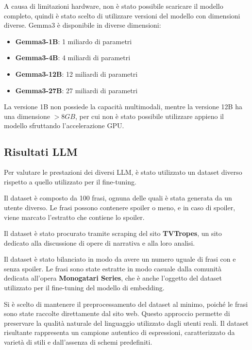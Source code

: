 A causa di limitazioni hardware, non è stato possibile
scaricare il modello completo, quindi è stato scelto di
utilizzare versioni del modello con dimensioni diverse.
Gemma3 è disponibile in diverse dimensioni:

\begin{itemize}
  \item \textbf{Gemma3-1B}: 1 miliardo di parametri
  \item \textbf{Gemma3-4B}: 4 miliardi di parametri
  \item \textbf{Gemma3-12B}: 12 miliardi di parametri
  \item \textbf{Gemma3-27B}: 27 miliardi di parametri
\end{itemize}

La versione 1B non possiede la capacità multimodali, mentre
la versione 12B ha una dimensione $>8GB$, per cui non è
stato possibile utilizzare appieno il modello sfruttando
l'accelerazione GPU.

\subsection{Risultati LLM}
\label{sec:llm_results}

Per valutare le prestazioni dei diversi LLM, è stato
utilizzato un dataset diverso rispetto a quello utilizzato
per il fine-tuning.

Il dataset è composto da 100 frasi, ognuna delle quali è
stata generata da un utente diverso.
Le frasi possono contenere spoiler o meno, e in caso di
spoiler, viene marcato l'estratto che contiene lo spoiler.

Il dataset è stato procurato tramite scraping del sito
\textbf{TVTropes}, un sito dedicato alla discussione di
opere di narrativa e alla loro analisi.

Il dataset è stato bilanciato in modo da avere un numero
uguale di frasi con e senza spoiler.
Le frasi sono state estratte in modo casuale dalla comunità
dedicata all'opera \textbf{Monogatari Series}, che è anche
l'oggetto del dataset utilizzato per il fine-tuning del
modello di embedding.

Si è scelto di mantenere il preprocessamento del dataset al
minimo, poiché le frasi sono state raccolte direttamente
dal sito web.
Questo approccio permette di preservare la qualità naturale
del linguaggio utilizzato dagli utenti reali.
Il dataset risultante rappresenta un campione autentico di
espressioni, caratterizzato da varietà di stili e
dall'assenza di schemi predefiniti.

